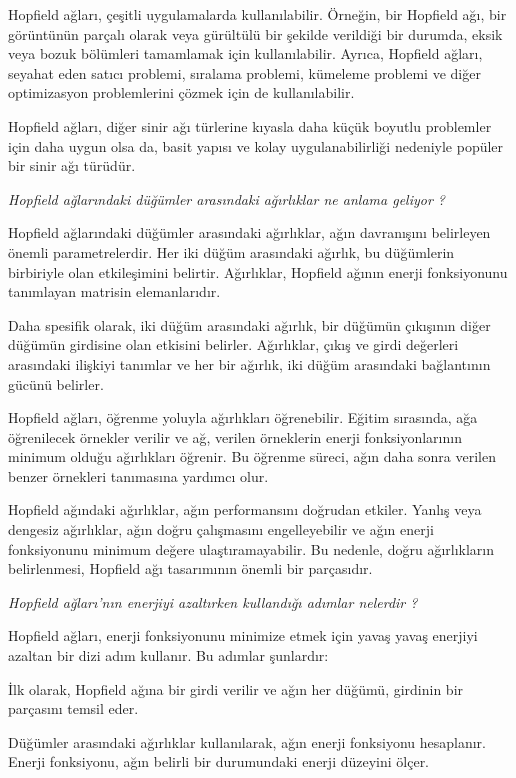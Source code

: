 \documentclass[11pt]{article}
\begin{document}
Hopfield ağları, çeşitli uygulamalarda kullanılabilir. Örneğin, bir Hopfield ağı, bir görüntünün parçalı olarak veya gürültülü bir şekilde verildiği bir durumda, eksik veya bozuk bölümleri tamamlamak için kullanılabilir. Ayrıca, Hopfield ağları, seyahat eden satıcı problemi, sıralama problemi, kümeleme problemi ve diğer optimizasyon problemlerini çözmek için de kullanılabilir.

Hopfield ağları, diğer sinir ağı türlerine kıyasla daha küçük boyutlu problemler için daha uygun olsa da, basit yapısı ve kolay uygulanabilirliği nedeniyle popüler bir sinir ağı türüdür.

\textit{Hopfield ağlarındaki düğümler arasındaki ağırlıklar ne anlama geliyor ?}

Hopfield ağlarındaki düğümler arasındaki ağırlıklar, ağın davranışını belirleyen önemli parametrelerdir. Her iki düğüm arasındaki ağırlık, bu düğümlerin birbiriyle olan etkileşimini belirtir. Ağırlıklar, Hopfield ağının enerji fonksiyonunu tanımlayan matrisin elemanlarıdır.

Daha spesifik olarak, iki düğüm arasındaki ağırlık, bir düğümün çıkışının diğer düğümün girdisine olan etkisini belirler. Ağırlıklar, çıkış ve girdi değerleri arasındaki ilişkiyi tanımlar ve her bir ağırlık, iki düğüm arasındaki bağlantının gücünü belirler.

Hopfield ağları, öğrenme yoluyla ağırlıkları öğrenebilir. Eğitim sırasında, ağa öğrenilecek örnekler verilir ve ağ, verilen örneklerin enerji fonksiyonlarının minimum olduğu ağırlıkları öğrenir. Bu öğrenme süreci, ağın daha sonra verilen benzer örnekleri tanımasına yardımcı olur.

Hopfield ağındaki ağırlıklar, ağın performansını doğrudan etkiler. Yanlış veya dengesiz ağırlıklar, ağın doğru çalışmasını engelleyebilir ve ağın enerji fonksiyonunu minimum değere ulaştıramayabilir. Bu nedenle, doğru ağırlıkların belirlenmesi, Hopfield ağı tasarımının önemli bir parçasıdır.

\textit{Hopfield ağları'nın enerjiyi azaltırken kullandığı adımlar nelerdir ?}

Hopfield ağları, enerji fonksiyonunu minimize etmek için yavaş yavaş enerjiyi azaltan bir dizi adım kullanır. Bu adımlar şunlardır:

İlk olarak, Hopfield ağına bir girdi verilir ve ağın her düğümü, girdinin bir parçasını temsil eder.

Düğümler arasındaki ağırlıklar kullanılarak, ağın enerji fonksiyonu hesaplanır. Enerji fonksiyonu, ağın belirli bir durumundaki enerji düzeyini ölçer.
\end{document}
